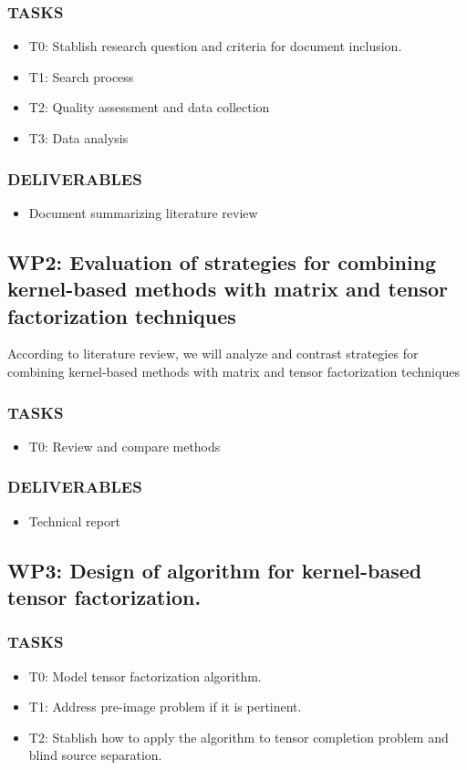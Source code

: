 \documentclass[letterpaper,12pt]{article}
\begin{document}
\subsubsection*{TASKS }
\begin{itemize}
\item T0: Stablish research question and criteria for document inclusion.
\item T1: Search process
\item T2: Quality assessment and data collection
\item T3: Data analysis
\end{itemize}
\subsubsection*{DELIVERABLES }
\begin{itemize}
\item Document summarizing literature review
\end{itemize}

\subsection*{WP2: Evaluation of strategies for combining kernel-based methods with matrix and tensor factorization techniques}
According to literature review, we will analyze and contrast strategies for combining kernel-based methods with matrix and tensor factorization techniques
\subsubsection*{TASKS}
\begin{itemize}
\item T0: Review and compare methods
\end{itemize}
\subsubsection*{DELIVERABLES}
\begin{itemize}
\item Technical report 
\end{itemize}

\subsection*{WP3: Design of algorithm for kernel-based tensor factorization.}
\subsubsection*{TASKS}
\begin{itemize}
\item T0: Model tensor factorization algorithm.
\item T1: Address pre-image problem if it is pertinent.
\item T2: Stablish how to apply the algorithm to tensor completion problem and blind source separation.
\end{itemize}
\end{document}
